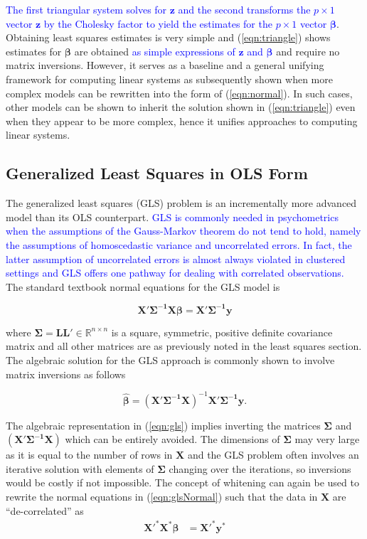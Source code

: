 \documentclass[12pt]{article}
\begin{document}
\textcolor{blue}{The first triangular system solves for $\bm{z}$ and the second transforms the $p \times 1$ vector $\bm{z}$ by the Cholesky factor to yield the estimates for the $p \times 1$ vector $\bm{\beta}$}. Obtaining least squares estimates is very simple and (\ref{eqn:triangle}) shows estimates for $\bm{\beta}$ are obtained \textcolor{blue}{as simple expressions of $\bm{z}$ and $\bm{\beta}$} and require no matrix inversions. However, it serves as a baseline and a general unifying framework for computing linear systems as subsequently shown when more complex models can be rewritten into the form of (\ref{eqn:normal}). In such cases, other models can be shown to inherit the solution shown in (\ref{eqn:triangle}) even when they appear to be more complex, hence it unifies approaches to computing linear systems.

\subsection*{Generalized Least Squares in OLS Form}

The generalized least squares (GLS) problem is an incrementally more advanced model than its OLS counterpart. \textcolor{blue}{GLS is commonly needed in psychometrics when the assumptions of the Gauss-Markov theorem do not tend to hold, namely the assumptions of homoscedastic variance and uncorrelated errors. In fact, the latter assumption of uncorrelated errors is almost always violated in clustered settings \cite{hedges} and GLS offers one pathway for dealing with correlated observations.} The standard textbook normal equations for the GLS model is

\begin{equation}
\bm{X'\Sigma^{-1}X}\bm{\beta} = \bm{X'\Sigma^{-1}y}
\label{eqn:glsNormal}
\end{equation}

\noindent where $\bm{\Sigma} = \bm{LL'} \in \mathbb{R}^{n \times n}$ is a square, symmetric, positive definite covariance matrix and all other matrices are as previously noted in the least squares section. The algebraic solution for the GLS approach is commonly shown to involve matrix inversions as follows

\begin{equation}
\label{eqn:gls}
\widehat{\bm{\beta}} = \bm{(X'\Sigma^{-1}X)}^{-1} \bm{X'\Sigma^{-1}y}.
\end{equation}

The algebraic representation in (\ref{eqn:gls}) implies inverting the matrices $\bm{\Sigma}$ and $\bm{(X'\Sigma^{-1}X)}$ which can be entirely avoided. The dimensions of $\bm{\Sigma}$ may very large as it is equal to the number of rows in $\bm{X}$ and the GLS problem often involves an iterative solution with elements of $\bm{\Sigma}$ changing over the iterations, so inversions would be costly if not impossible. The concept of whitening can again be used to rewrite the normal equations in (\ref{eqn:glsNormal}) such that the data in $\bm{X}$ are ``de-correlated'' as 
\begin{align}
\bm{X'^{*}X^{*}}\bm{\beta}	&= \bm{X'^{*}y^{*}}  \label{eqn:glsNormal2}
\end{align}
\end{document}
